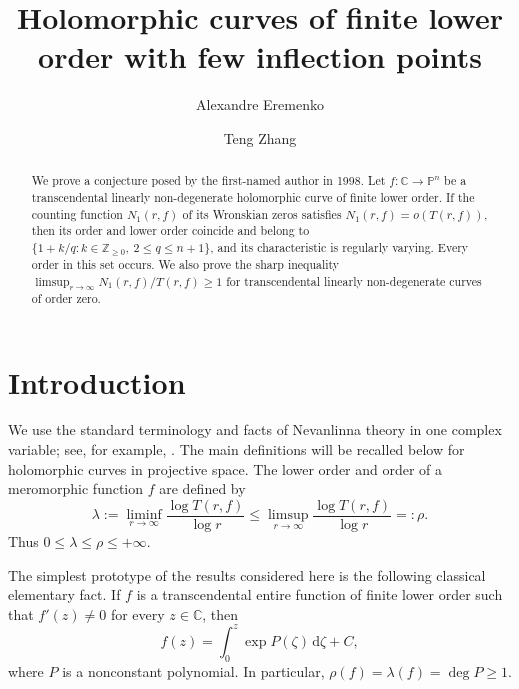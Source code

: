 \documentclass[11pt,letterpaper,reqno]{amsart}
\theoremstyle{remark}
\numberwithin{equation}{section}
\newcommand{\C}{\mathbb C}
\newcommand{\Z}{\mathbb Z}
\newcommand{\PP}{\mathbb P}
\begin{document}
\title[Curves with few inflection points]{Holomorphic curves of finite lower order with few inflection points}
\author[A.~Eremenko]{Alexandre Eremenko}
\address{Mathematics Department, Purdue University, West Lafayette, IN 47907, USA}
\author[T.~Zhang]{Teng Zhang}
\address{School of Mathematics and Statistics, Xi'an Jiaotong University,
Xi'an 710049, P. R. China}
\date{}
\begin{abstract}
We prove a conjecture posed by the first-named author in 1998. Let
$f\colon\C\to\PP^n$ be a transcendental linearly non-degenerate holomorphic
curve of finite lower order. If the counting function $N_1(r,f)$ of its
Wronskian zeros satisfies $N_1(r,f)=o(T(r,f))$, then its order and lower order
coincide and belong to
$\{1+k/q:k\in\Z_{\ge0},\ 2\le q\le n+1\}$, and its characteristic is
regularly varying. Every order in this set occurs. We also prove the sharp
inequality $\limsup_{r\to\infty}N_1(r,f)/T(r,f)\ge1$ for transcendental
linearly non-degenerate curves of order zero.
\end{abstract}
\maketitle
\tableofcontents


\section{Introduction}\label{sec:intro}

We use the standard terminology and facts of Nevanlinna theory in
one complex variable; see, for example, \cite{Hay64}. The main definitions
will be recalled below for holomorphic curves in projective space.
The lower order and order of a meromorphic function $f$ are defined by
\[
 \lambda:=\liminf_{r\to\infty}\frac{\log T(r,f)}{\log r}
 \leq\limsup_{r\to\infty}\frac{\log T(r,f)}{\log r}=: \rho.
\]
Thus $0\leq\lambda\leq\rho\leq+\infty$.

The simplest prototype of the results considered here is the following
classical elementary fact. If $f$ is a transcendental entire function of
finite lower order such that $f'(z)\ne0$ for every $z\in\C$, then
\[
 f(z)=\int_0^z\exp P(\zeta)\,\mathrm d\zeta+C,
\]
where $P$ is a nonconstant polynomial. In particular,
$
 \rho(f)=\lambda(f)=\deg P\geq1.
$
\end{document}
